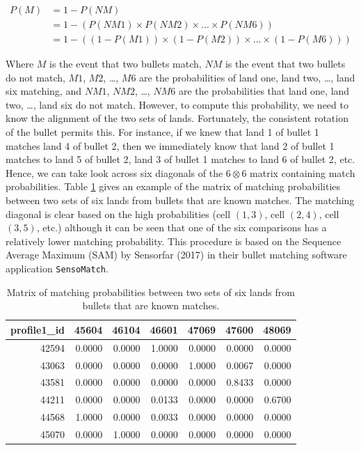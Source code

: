 \documentclass[12pt,]{article}
\theoremstyle{definition}
\theoremstyle{definition}
\theoremstyle{definition}
\theoremstyle{remark}
\begin{document}
\begin{align}
P(M) &= 1 - P(NM) \\
     &= 1 - (P(NM1) \times P(NM2) \times ... \times P(NM6)) \\
     &= 1 - ((1 - P(M1)) \times (1 - P(M2)) \times ... \times (1 - P(M6)))
\end{align}

Where \(M\) is the event that two bullets match, \(NM\) is the event
that two bullets do not match, \(M1\), \(M2\), \ldots{}, \(M6\) are the
probabilities of land one, land two, \ldots{}, land six matching, and
\(NM1\), \(NM2\), \ldots{}, \(NM6\) are the probabilities that land one,
land two, \ldots{}, land six do not match. However, to compute this
probability, we need to know the alignment of the two sets of lands.
Fortunately, the consistent rotation of the bullet permits this. For
instance, if we knew that land 1 of bullet 1 matches land 4 of bullet 2,
then we immediately know that land 2 of bullet 1 matches to land 5 of
bullet 2, land 3 of bullet 1 matches to land 6 of bullet 2, etc. Hence,
we can take look across six diagonals of the \(6 \otimes 6\) matrix
containing match probabilities. Table \ref{tab:diag} gives an example of
the matrix of matching probabilities between two sets of six lands from
bullets that are known matches. The matching diagonal is clear based on
the high probabilities (cell \((1, 3)\), cell \((2, 4)\), cell
\((3, 5)\), etc.) although it can be seen that one of the six
comparisons has a relatively lower matching probability. This procedure
is based on the Sequence Average Maximum (SAM) by Sensorfar (2017) in
their bullet matching software application \texttt{SensoMatch}.

\begin{table}[ht]
\centering
\begin{tabular}{rrrrrrr}
  \hline
profile1\_id & 45604 & 46104 & 46601 & 47069 & 47600 & 48069 \\ 
  \hline
42594 & 0.0000 & 0.0000 & 1.0000 & 0.0000 & 0.0000 & 0.0000 \\ 
  43063 & 0.0000 & 0.0000 & 0.0000 & 1.0000 & 0.0067 & 0.0000 \\ 
  43581 & 0.0000 & 0.0000 & 0.0000 & 0.0000 & 0.8433 & 0.0000 \\ 
  44211 & 0.0000 & 0.0000 & 0.0133 & 0.0000 & 0.0000 & 0.6700 \\ 
  44568 & 1.0000 & 0.0000 & 0.0033 & 0.0000 & 0.0000 & 0.0000 \\ 
  45070 & 0.0000 & 1.0000 & 0.0000 & 0.0000 & 0.0000 & 0.0000 \\ 
   \hline
\end{tabular}
\caption{Matrix of matching probabilities between two sets of six lands from bullets that are known matches.} 
\label{tab:diag}
\end{table}
\end{document}
